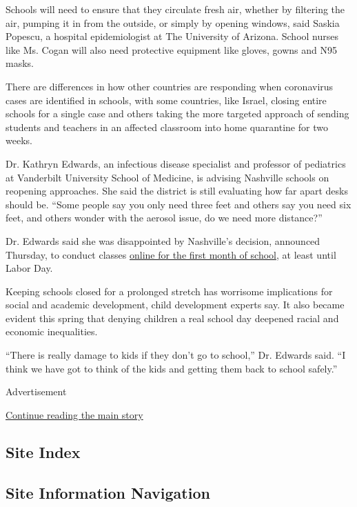 Schools will need to ensure that they circulate fresh air, whether by
filtering the air, pumping it in from the outside, or simply by opening
windows, said Saskia Popescu, a hospital epidemiologist at The
University of Arizona. School nurses like Ms. Cogan will also need
protective equipment like gloves, gowns and N95 masks.

There are differences in how other countries are responding when
coronavirus cases are identified in schools, with some countries, like
Israel, closing entire schools for a single case and others taking the
more targeted approach of sending students and teachers in an affected
classroom into home quarantine for two weeks.

Dr. Kathryn Edwards, an infectious disease specialist and professor of
pediatrics at Vanderbilt University School of Medicine, is advising
Nashville schools on reopening approaches. She said the district is
still evaluating how far apart desks should be. ``Some people say you
only need three feet and others say you need six feet, and others wonder
with the aerosol issue, do we need more distance?''

Dr. Edwards said she was disappointed by Nashville's decision, announced
Thursday, to conduct classes
\href{https://www.tennessean.com/story/news/education/2020/07/09/metro-schools-academic-year-start-online-nashville-students/5383315002/}{online
for the first month of school}, at least until Labor Day.

Keeping schools closed for a prolonged stretch has worrisome
implications for social and academic development, child development
experts say. It also became evident this spring that denying children a
real school day deepened racial and economic inequalities.

``There is really damage to kids if they don't go to school,'' Dr.
Edwards said. ``I think we have got to think of the kids and getting
them back to school safely.''

Advertisement

\protect\hyperlink{after-bottom}{Continue reading the main story}

\hypertarget{site-index}{%
\subsection{Site Index}\label{site-index}}

\hypertarget{site-information-navigation}{%
\subsection{Site Information
Navigation}\label{site-information-navigation}}

